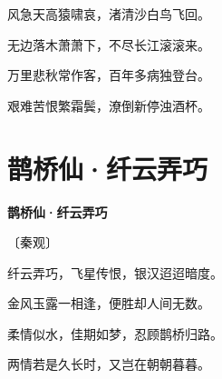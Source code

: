 \documentclass[12pt,UTF-8,openany,fontset=none]{ctexbook}
\begin{document}
    \vspace{8pt}

\begin{center}
    \begin{Large}

        风急天高猿啸哀，渚清沙白鸟飞回。

        无边落木萧萧下，不尽长江滚滚来。

        万里悲秋常作客，百年多病独登台。

        艰难苦恨繁霜鬓，潦倒新停浊酒杯。

    \end{Large}

\end{center}

\vspace{8pt}
\clearpage

\section{鹊桥仙·纤云弄巧}


\begin{center}
    {\bfseries 鹊桥仙·纤云弄巧}

    \vspace{18pt}

    \begin{large}\xuwen
        〔秦观〕
    \end{large}

\end{center}

    \vspace{18pt}  %

\begin{center}
    \begin{Large}

        纤云弄巧，飞星传恨，银汉迢迢暗度。

        金风玉露一相逢，便胜却人间无数。

        \vspace{18pt}  %

        柔情似水，佳期如梦，忍顾鹊桥归路。

        两情若是久长时，又岂在朝朝暮暮。

    \end{Large}

\end{center}

\vspace{8pt}
\clearpage
\end{document}
